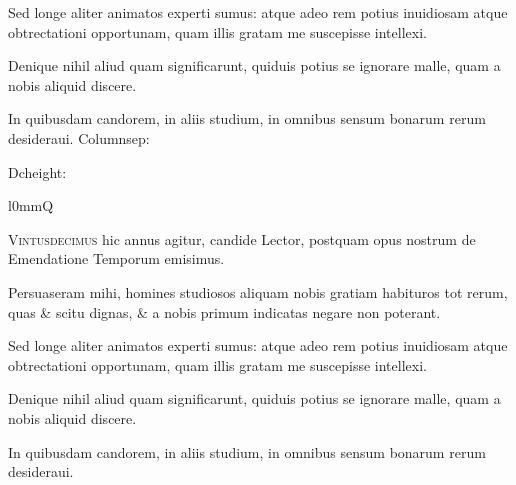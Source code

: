 Sed longe aliter animatos experti sumus: atque adeo rem potius inuidiosam atque obtrectationi opportunam, quam illis gratam me suscepisse intellexi.

Denique nihil aliud quam significarunt, quiduis potius se ignorare malle, quam a nobis aliquid discere.

In quibusdam candorem, in aliis studium, in omnibus sensum bonarum rerum desideraui.
Columnsep: \the\columnsep

\setcounter{parcount}{0}
\begin{parnumbers}

\newlength{\dcunit}\setlength{\dcunit}{1.4\baselineskip}
\newlength{\dcscale}\setlength{\dcscale}{12\dcunit}
\addtolength{\dcscale}{-0.5\dcunit}
Dcheight: \the\dcscale

\setlength{\columnsep}{1pt}\begin{wrapfigure}[12]{l}{0mm}{\fontsize{\dcscale}{1em}\selectfont Q}\end{wrapfigure}
\textsc{Vintusdecimus} hic annus agitur, candide Lector, postquam opus nostrum de Emendatione Temporum emisimus.

Persuaseram mihi, homines studiosos aliquam nobis gratiam habituros tot rerum, quas \& scitu dignas, \& a nobis primum indicatas negare non poterant.

Sed longe aliter animatos experti sumus: atque adeo rem potius inuidiosam atque obtrectationi opportunam, quam illis gratam me suscepisse intellexi.

Denique nihil aliud quam significarunt, quiduis potius se ignorare malle, quam a nobis aliquid discere.

In quibusdam candorem, in aliis studium, in omnibus sensum bonarum rerum desideraui.
\end{parnumbers}


